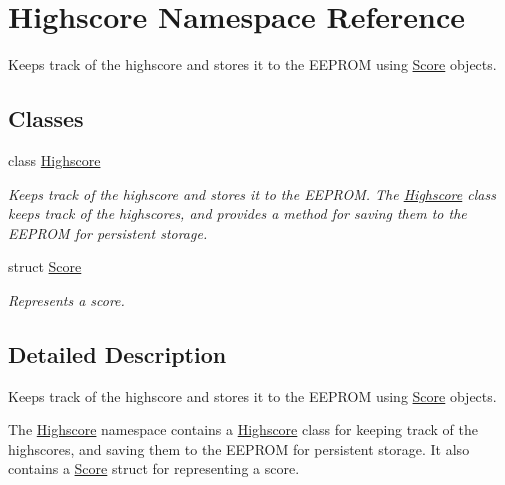 \hypertarget{namespace_highscore}{}\section{Highscore Namespace Reference}
\label{namespace_highscore}


Keeps track of the highscore and stores it to the E\+E\+P\+R\+OM using \hyperlink{struct_highscore_1_1_score}{Score} objects.  


\subsection*{Classes}
\begin{DoxyCompactItemize}
\item 
class \hyperlink{class_highscore_1_1_highscore}{Highscore}
\begin{DoxyCompactList}\small\item\em Keeps track of the highscore and stores it to the E\+E\+P\+R\+OM. The \hyperlink{class_highscore_1_1_highscore}{Highscore} class keeps track of the highscores, and provides a method for saving them to the E\+E\+P\+R\+OM for persistent storage. \end{DoxyCompactList}\item 
struct \hyperlink{struct_highscore_1_1_score}{Score}
\begin{DoxyCompactList}\small\item\em Represents a score. \end{DoxyCompactList}\end{DoxyCompactItemize}


\subsection{Detailed Description}
Keeps track of the highscore and stores it to the E\+E\+P\+R\+OM using \hyperlink{struct_highscore_1_1_score}{Score} objects. 

The \hyperlink{namespace_highscore}{Highscore} namespace contains a \hyperlink{namespace_highscore}{Highscore} class for keeping track of the highscores, and saving them to the E\+E\+P\+R\+OM for persistent storage. It also contains a \hyperlink{struct_highscore_1_1_score}{Score} struct for representing a score. 